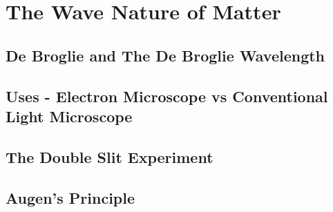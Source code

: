 \documentclass[../../Quantum-Technologies-Notes]{subfiles}
\begin{document}
	
	\ifSubfilesClassLoaded{ \pagestyle{fancy} }{}
	

	\section{The Wave Nature of Matter}
		
		\subsection{De Broglie and The De Broglie Wavelength}
		
		
		\subsection{Uses - Electron Microscope vs Conventional Light Microscope}
		
		
		\subsection{The Double Slit Experiment}
			
			
		
		\subsection{Augen’s Principle}
		
		
		\pagebreak
\end{document}
